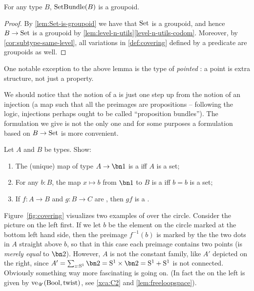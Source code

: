 \begin{lemma}\label{lem:setbundle-is-groupoid}
For any type $B$, $\mathrm{SetBundle}(B)$ is a groupoid.
\end{lemma}
\begin{proof}
By \cref{lem:Set-is-groupoid} we have that $\mathrm{Set}$ is a groupoid, 
and hence $B\to\mathrm{Set}$ is a groupoid by \cref{lem:level-n-utils}\ref{level-n-utils-codom}.
Moreover, by \cref{cor:subtype-same-level}, all variations in \cref{def:covering}
defined by a predicate are groupoids as well.
\end{proof}
One notable exception to the above lemma is the type of \emph{pointed} \coverings:
a point is extra structure, not just a property.

We should notice that the notion of a \covering is just one step up from the notion of an
injection (a map such that all the preimages are propositions -- 
following the logic, injections perhaps ought to be called ``proposition bundles''). 
The formulation we give is not the only one and for some purposes a formulation
based on $B\to\mathrm{Set}$ is more convenient.

\begin{xca}\label{xca:constant-cover}
Let $A$ and $B$ be types. Show:
\begin{enumerate}
\item The (unique) map of type $A\to\bn 1$ is a \covering iff $A$ is a set;
\item For any $b:B$, the map $x \mapsto b$ from $\bn 1$ to $B$ is 
a \covering iff $b=b$ is a set;
\item If $f: A\to B$ and $g: B\to C$ are \coverings, then $gf$ is a \covering.\endproof
\end{enumerate}
\end{xca}

Figure~\ref{fig:covering} visualizes two examples of \coverings over the circle.  
Consider the picture on the left first.  
If we let $b$ be the element on the circle marked at the bottom left hand side, 
then the preimage $f^{-1}(b)$ is marked by the the two dots in $A$ straight above $b$, 
so that in this case each preimage contains two points (is \emph{merely equal} to $\bn 2$).  
However, $A$ is not the constant family, like $A'$ depicted on the right, since 
$A'=\sum_{z:\Sc}\bn 2=\Sc\times\bn 2=\Sc+\Sc$ is not connected.  
Obviously something way more fascinating is going on.
(In fact the \covering on the left is given by $\ve_\UU(\bool,\twist)$,
see \cref{xca:C2} and \cref{lem:freeloopspace}).

